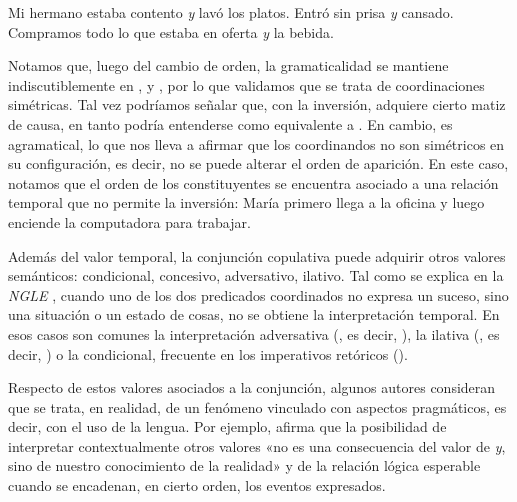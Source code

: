 \begin{exe}
  \ex\label{ex:12-inv}
    \begin{xlist}
      \ex\label{ex:12-inv-a} Mi hermano estaba contento \textit{y} lavó los
          platos.
      \ex\label{ex:12-inv-c} Entró sin prisa \textit{y} cansado.
      \ex\label{ex:12-inv-d} Compramos todo lo que estaba en oferta \textit{y} la
          bebida.
    \end{xlist}
\end{exe}

Notamos que, luego del cambio de orden, la gramaticalidad se mantiene
indiscutiblemente en ,  y
, por lo que validamos que se trata de coordinaciones
simétricas. Tal vez podríamos señalar que, con la inversión,
 adquiere cierto matiz de causa, en tanto podría entenderse
como equivalente a . En
cambio,  es agramatical, lo que nos lleva a afirmar que los
coordinandos no son simétricos en su configuración, es decir, no se puede
alterar el orden de aparición. En este caso, notamos que el orden de los
constituyentes se encuentra asociado a una relación temporal que no permite la
inversión: María primero llega a la oficina y luego enciende la computadora para
trabajar.

Además del valor temporal, la conjunción copulativa puede adquirir otros valores
semánticos: condicional, concesivo, adversativo, ilativo. Tal como se explica en
la \textit{NGLE} \parencite[§\,31.2m]{rae2025}, cuando uno de los dos predicados
coordinados no expresa un suceso, sino una situación o un estado de cosas, no se
obtiene la interpretación temporal. En esos casos son comunes la interpretación
adversativa (, es decir,
), la ilativa (, es decir, ) o la condicional, frecuente en los
imperativos retóricos ().

Respecto de estos valores asociados a la conjunción, algunos autores consideran
que se trata, en realidad, de un fenómeno vinculado con aspectos pragmáticos, es
decir, con el uso de la lengua. Por ejemplo, \textcite[195]{jimenezjulia2023}
afirma que la posibilidad de interpretar contextualmente otros valores «no es una
consecuencia del valor de \textit{y}, sino de nuestro conocimiento de la
realidad» y de la relación lógica esperable cuando se encadenan, en cierto
orden, los eventos expresados.


